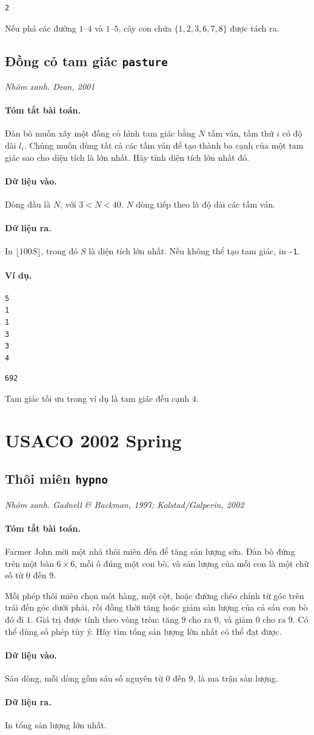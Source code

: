 \documentclass[11pt]{article}
\newcommand{\problem}[4]{%
  \subsection[#1 (#2)]{#1 \hfill {\normalsize\texttt{#2}}}%
  \noindent\textit{#3. #4}\par\smallskip
}
\newcommand{\iosec}[1]{\paragraph{#1}}
\begin{document}
\begin{verbatim}
2
\end{verbatim}

Nếu phá các đường \(1\)--\(4\) và \(1\)--\(5\), cây con chứa
\(\{1,2,3,6,7,8\}\) được tách ra.

\problem{Đồng cỏ tam giác}{pasture}{Nhóm xanh}{Dean, 2001}

\iosec{Tóm tắt bài toán.}
Đàn bò muốn xây một đồng cỏ hình tam giác bằng \(N\) tấm ván, tấm thứ \(i\) có
độ dài \(l_i\). Chúng muốn dùng tất cả các tấm ván để tạo thành ba cạnh của
một tam giác sao cho diện tích là lớn nhất. Hãy tính diện tích lớn nhất đó.

\iosec{Dữ liệu vào.}
Dòng đầu là \(N\), với \(3<N<40\). \(N\) dòng tiếp theo là độ dài các tấm ván.

\iosec{Dữ liệu ra.}
In \(\lfloor 100S\rfloor\), trong đó \(S\) là diện tích lớn nhất. Nếu không
thể tạo tam giác, in \texttt{-1}.

\iosec{Ví dụ.}
\begin{verbatim}
5
1
1
3
3
4
\end{verbatim}

\begin{verbatim}
692
\end{verbatim}

Tam giác tối ưu trong ví dụ là tam giác đều cạnh \(4\).

\section{USACO 2002 Spring}

\problem{Thôi miên}{hypno}{Nhóm xanh}{Gadnell \& Backman, 1997; Kolstad/Galperin, 2002}

\iosec{Tóm tắt bài toán.}
Farmer John mời một nhà thôi miên đến để tăng sản lượng sữa. Đàn bò đứng trên
một bàn \(6\times 6\), mỗi ô đúng một con bò, và sản lượng của mỗi con là một
chữ số từ \(0\) đến \(9\).

Mỗi phép thôi miên chọn một hàng, một cột, hoặc đường chéo chính từ góc trên
trái đến góc dưới phải, rồi đồng thời tăng hoặc giảm sản lượng của cả sáu con
bò đó đi \(1\). Giá trị được tính theo vòng tròn: tăng \(9\) cho ra \(0\), và
giảm \(0\) cho ra \(9\). Có thể dùng số phép tùy ý. Hãy tìm tổng sản lượng lớn
nhất có thể đạt được.

\iosec{Dữ liệu vào.}
Sáu dòng, mỗi dòng gồm sáu số nguyên từ \(0\) đến \(9\), là ma trận sản lượng.

\iosec{Dữ liệu ra.}
In tổng sản lượng lớn nhất.
\end{document}
